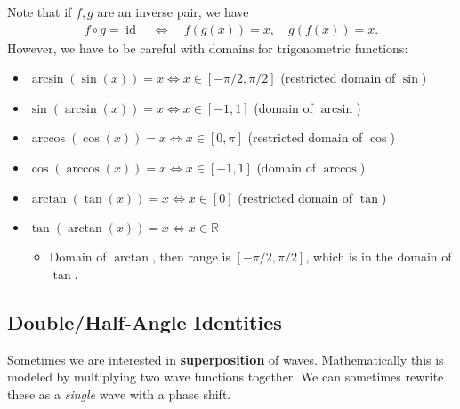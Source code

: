 \begin{warnings}

Note that if \(f, g\) are an inverse pair, we have
\begin{align*}
f\circ g = \operatorname{id}\quad\iff\quad f(g(x)) = x,\quad g(f(x)) = x
.\end{align*}
However, we have to be careful with domains for trigonometric functions:

\begin{itemize}
\tightlist
\item
  \(\arcsin(\sin(x)) = x \iff x\in [-\pi/2, \pi/2]\) (restricted domain
  of \(\sin\))
\item
  \(\sin(\arcsin(x)) = x \iff x\in [-1, 1]\) (domain of \(\arcsin\))
\item
  \(\arccos(\cos(x)) = x \iff x\in [0, \pi]\) (restricted domain of
  \(\cos\))
\item
  \(\cos(\arccos(x)) = x \iff x\in [-1, 1]\) (domain of \(\arccos\))
\item
  \(\arctan(\tan(x)) = x \iff x\in [0]\) (restricted domain of \(\tan\))
\item
  \(\tan(\arctan(x)) = x \iff x\in {\mathbb{R}}\)

  \begin{itemize}
  \tightlist
  \item
    Domain of \(\arctan\), then range is \([-\pi/2, \pi/2]\), which is
    in the domain of \(\tan\).
  \end{itemize}
\end{itemize}

\end{warnings}

\hypertarget{doublehalf-angle-identities}{%
\subsection{Double/Half-Angle
Identities}\label{doublehalf-angle-identities}}

\begin{remark}

Sometimes we are interested in \textbf{superposition} of waves.
Mathematically this is modeled by multiplying two wave functions
together. We can sometimes rewrite these as a \emph{single} wave with a
phase shift.

\end{remark}

